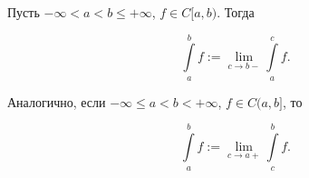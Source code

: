 \begin{definition} \thmslashn 

    Пусть $-\infty < a < b \le +\infty$, $f\in C[a, b)$. Тогда

    \[ \int\limits_{a}^{b} f := \lim\limits_{c \to b-} \int\limits_{a}^{c} f   .\] 

    Аналогично, если $-\infty \le a < b < +\infty$, $f\in C(a, b]$, то

    \[ \int\limits_{a}^{b} f := \lim\limits_{c \to a+} \int\limits_{c}^{b} f     .\] 
\end{definition}
